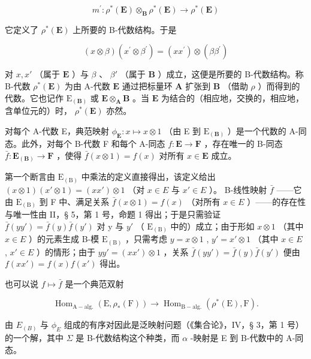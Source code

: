 \[
m ^ {\prime}: \rho^ {*} (\mathbf {E}) \otimes_ {\mathbf {B}} \rho^ {*} (\mathbf {E}) \rightarrow \rho^ {*} (\mathbf {E})
\]

它定义了 \(\rho^{*}(\mathbf{E})\) 上所要的 B-代数结构。于是

\[
(x \otimes \beta) (x ^ {\prime} \otimes \beta^ {\prime}) = (x x ^ {\prime}) \otimes (\beta \beta^ {\prime})\tag{5}
\]

对 \(x, x'\) （属于 \(\mathbf{E}\) ）与 \(\beta\) 、 \(\beta'\) （属于 \(\mathbf{B}\) ）成立，这便是所要的 B-代数结构。称 B-代数 \(\rho^*(\mathbf{E})\) 为由 A-代数 \(\mathbf{E}\) 通过把标量环 \(\mathbf{A}\) 扩张到 \(\mathbf{B}\) （借助 \(\rho\) ）而得到的代数。它也记作 \(\mathrm{E}_{(\mathbf{B})}\) 或 \(\mathbf{E} \otimes_{\mathbf{A}} \mathbf{B}\) 。当 \(\mathbf{E}\) 为结合的（相应地，交换的，相应地，含单位元的）时， \(\rho^*(\mathbf{E})\) 亦然。

对每个 A-代数 E，典范映射 \(\phi_{\mathbf{E}}: x \mapsto x \otimes 1\) （由 E 到 \(\mathrm{E}_{(\mathbf{B})}\) ）是一个代数的 A-同态。此外，对每个 B-代数 F 和每个 A-同态 \(f: \mathbf{E} \to \mathbf{F}\) ，存在唯一的 B-同态 \(\bar{f}: \mathbf{E}_{(\mathbf{B})} \to \mathbf{F}\) ，使得 \(\bar{f}(x \otimes 1) = f(x)\) 对所有 \(x \in \mathbf{E}\) 成立。

第一个断言由 \(\mathrm{E}_{(\mathrm{B})}\) 中乘法的定义直接得出，该定义给出 \((x\otimes1)(x'\otimes1)=(xx')\otimes1\) （对 \(x\in E\) 与 \(x'\in E\) ）。 B-线性映射 \(\bar{f}\) ——它由 \(\mathrm{E}_{(\mathrm{B})}\) 到 F 中、满足关系 \(\bar{f}(x\otimes1)=f(x)\) （对所有 \(x\in E\) ）——的存在性与唯一性由 II，§ 5，第 1 号，命题 1 得出；于是只需验证 \(\bar{f}(yy')=\bar{f}(y)\bar{f}(y')\) 对 y 与 \(y'\) （ \(\mathrm{E}_{(\mathrm{B})}\) 中的）成立；由于形如 \(x\otimes1\) （其中 \(x\in E\) ）的元素生成 B-模 \(\mathrm{E}_{(\mathrm{B})}\) ，只需考虑 \(y=x\otimes1\) , \(y'=x'\otimes1\) （其中 \(x\in E\) , \(x'\in E\) ）的情形；由于 \(yy'=(xx')\otimes1\) ，关系 \(\bar{f}(yy')=\bar{f}(y)\bar{f}(y')\) 便由 \(f(xx')=f(x)f(x')\) 得出。

也可以说 \(f \mapsto \bar{f}\) 是一个典范双射

\[
\operatorname{Hom} _ {\mathrm{A-alg.}} (\mathrm{E}, \rho_ {*} (\mathrm{F})) \rightarrow \operatorname{Hom} _ {\mathrm{B-alg.}} (\rho^ {*} (\mathrm{E}), \mathrm{F}).\tag{6}
\]

由 \(E_{(B)}\) 与 \(\phi_{E}\) 组成的有序对因此是泛映射问题（《集合论》，IV，§ 3，第 1 号）的一个解，其中 \(\Sigma\) 是 B-代数结构这个种类，而 \(\alpha\) -映射是 E 到 B-代数中的 A-同态。

